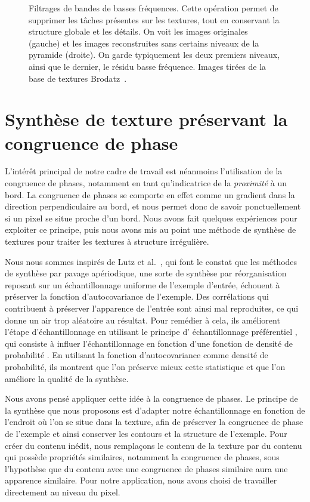 \begin{figure}
    \caption[Filtrage de bandes de basses fréquences]{Filtrages de bandes de basses fréquences. Cette opération permet de supprimer les tâches présentes sur les textures, tout en conservant la structure globale et les détails. On voit les images originales (gauche) et les images reconstruites sans certains niveaux de la pyramide (droite). On garde typiquement les deux premiers niveaux, ainsi que le dernier, le résidu basse fréquence. Images tirées de la base de textures Brodatz~\cite{abdelmounaime_new_2013}.}
    \label{fig:filter-low-freq}
\end{figure}

\section{Synthèse de texture préservant la congruence de phase}

L'intérêt principal de notre cadre de travail est néanmoins l'utilisation de la congruence de phases, notamment en tant qu'indicatrice de la \textit{proximité} à un bord. La congruence de phases se comporte en effet comme un gradient dans la direction perpendiculaire au bord, et nous permet donc de savoir ponctuellement si un pixel se situe proche d'un bord.  Nous avons fait quelques expériences pour exploiter ce principe, puis nous avons mis au point une méthode de synthèse de textures pour traiter les textures à structure irrégulière.

Nous nous sommes inspirés de Lutz et al.~\cite{lutz_preserving_2023}, qui font le constat que les méthodes de synthèse par pavage apériodique, une sorte de synthèse par réorganisation reposant sur un échantillonnage uniforme de l'exemple d'entrée, échouent à préserver la fonction d'autocovariance de l'exemple. Des corrélations qui contribuent à préserver l'apparence de l'entrée sont ainsi mal reproduites, ce qui donne un air trop aléatoire au résultat. Pour remédier à cela, ils améliorent l'étape d'échantillonnage en utilisant le principe d' \og échantillonnage préférentiel \fg{}, qui consiste à influer l'échantillonnage en fonction d'une \og fonction de densité de probabilité \fg{}. En utilisant la fonction d'autocovariance comme densité de probabilité, ils montrent que l'on préserve mieux cette statistique et que l'on améliore la qualité de la synthèse.

Nous avons pensé appliquer cette idée à la congruence de phases. Le principe de la synthèse que nous proposons est d'adapter notre échantillonnage en fonction de l'endroit où l'on se situe dans la texture, afin de préserver la congruence de phase de l'exemple et ainsi conserver les contours et la structure de l'exemple. Pour créer du contenu inédit, nous remplaçons le contenu de la texture par du contenu qui possède propriétés similaires, notamment la congruence de phases, sous l'hypothèse que du contenu avec une congruence de phases similaire aura une apparence similaire. Pour notre application, nous avons choisi de travailler directement au niveau du pixel.


